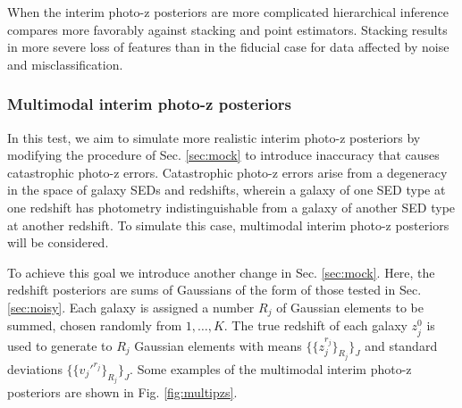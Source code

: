 \documentclass[preprint]{aastex}
\begin{document}
\begin{figure}
\caption{}
\label{fig:noisy-samp}
\end{figure}

\begin{figure}
\caption{}
\label{fig:noisy-comp}
\end{figure}

When the interim photo-z posteriors are more complicated hierarchical inference 
compares more favorably against stacking and point estimators.   Stacking 
results in more severe loss of features than in the fiducial case for data 
affected by noise and misclassification.  

\clearpage
\subsubsection{Multimodal interim photo-z posteriors}
\label{sec:multi}

In this test, we aim to simulate more realistic interim photo-z posteriors by 
modifying the procedure of Sec. \ref{sec:mock} to introduce inaccuracy that 
causes catastrophic photo-z errors.  Catastrophic photo-z errors arise from a 
degeneracy in the space of galaxy SEDs and redshifts, wherein a galaxy of one 
SED type at one redshift has photometry indistinguishable from a galaxy of 
another SED type at another redshift.  To simulate this case, multimodal 
interim photo-z posteriors will be considered.

To achieve this goal we introduce another change in Sec. \ref{sec:mock}.  Here, 
the redshift posteriors are sums of Gaussians of the form of those tested in 
Sec. \ref{sec:noisy}.  Each galaxy is assigned a number $R_{j}$ of Gaussian 
elements to be summed, chosen randomly from $1,\dots,K$.  The true redshift of 
each galaxy $z_{j}^{0}$ is used to generate to $R_{j}$ Gaussian elements with 
means $\{\{z_{j}^{r_{j}}\}_{R_{j}}\}_{J}$ and standard deviations 
$\{\{v_{j}'^{r_{j}}\}_{R_{j}}\}_{J}$.  Some examples of the multimodal interim 
photo-z posteriors are shown in Fig. \ref{fig:multipzs}.  
\end{document}
